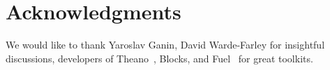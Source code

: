\documentclass[a4paper]{article}
\begin{document}
\section{Acknowledgments}

We would like to thank Yaroslav Ganin, David Warde-Farley for insightful discussions,
developers of Theano~\cite{theano2016theano}, Blocks, and Fuel~\cite{MerrienboerBDSW15} 
for great toolkits.




\end{document}
